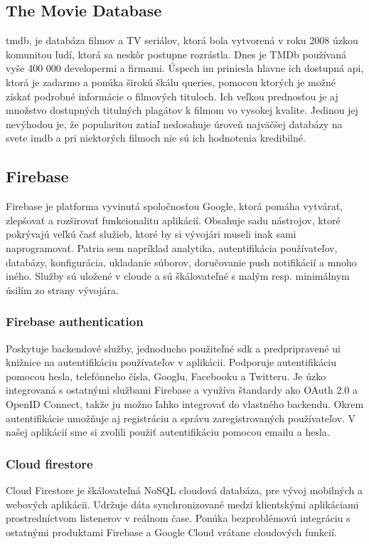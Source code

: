 \subsection{The Movie Database}
 \acrfull{tmdb}, je databáza filmov a TV seriálov, ktorá bola vytvorená v roku 2008 úzkou komunitou ľudí, ktorá sa neskôr postupne rozrástla. Dnes je TMDb používaná vyše 400 000 developermi a firmami. \cite{tmdb} Úspech im priniesla hlavne ich dostupná \acrshort{api}, ktorá je zadarmo a ponúka širokú škálu queries, pomocou ktorých je možné získať podrobné informácie o filmových tituloch. Ich veľkou prednosťou je aj množstvo dostupných titulných plagátov k filmom vo vysokej kvalite. Jedinou jej nevýhodou je, že popularitou zatiaľ nedosahuje úroveň najväčšej databázy na svete \acrshort{imdb} a pri niektorých filmoch nie sú ich hodnotenia kredibilné. \\

\subsection{Firebase}
Firebase je platforma vyvinutá spoločnosťou Google, ktorá pomáha vytvárať, zlepšovať a rozširovať funkcionalitu aplikácií. Obsahuje sadu nástrojov, ktoré pokrývajú veľkú časť služieb, ktoré by si vývojári museli inak sami naprogramovať. Patria sem napríklad analytika, autentifikácia používateľov, databázy, konfigurácia, ukladanie súborov, doručovanie push notifikácií a mnoho iného. Služby sú uložené v cloude a sú škálovateľné s malým resp. minimálnym úsilím zo strany vývojára. \cite{firebase} \\

\subsubsection{Firebase authentication}
\label{sec:firebaseauth}
Poskytuje backendové služby, jednoducho použiteľné \acrshort{sdk} a predpripravené \acrshort{ui} knižnice na autentifikáciu používateľov v aplikácii. Podporuje autentifikáciu pomocou hesla, telefónneho čísla, Googlu, Facebooku a Twitteru. Je úzko integrovaná s ostatnými službami Firebase a využíva  štandardy ako OAuth 2.0 a OpenID Connect, takže ju možno ľahko integrovať do vlastného backendu. \cite{auth} Okrem autentifikácie umožňuje aj registráciu a správu zaregistrovaných používateľov. V našej aplikácií sme si zvolili použiť autentifikáciu pomocou emailu a hesla. \\

\subsubsection{Cloud firestore}
\label{sec:firestore}
Cloud Firestore je škálovateľná NoSQL cloudová databáza, pre vývoj mobilných a webových aplikácii. Udržuje dáta synchronizované medzi klientskými aplikáciami prostredníctvom listenerov v reálnom čase. Ponúka bezproblémovú integráciu s ostatnými produktami Firebase a Google Cloud vrátane cloudových funkcií. 

